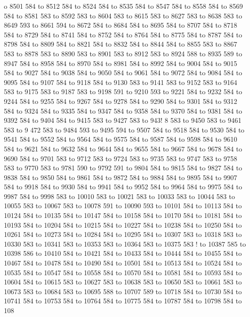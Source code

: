 o 8501 584 to 8512 584 to 8524 584 to 8535 584 to 8547 584 to 8558 584 to 8569 584 to 8581 583 to 8592 583 to 8604 583 to 8615 583 to 8627 583 to 8638 583 to 8649 593 to 8661 594 to 8672 584 to 8684 584 to 8695 584 to 8707 584 to 8718 584 to 8729 584 to 8741 584 to 8752 584 to 8764 584 to 8775 584 to 8787 584 to 8798 584 to 8809 584 to 8821 584 to 8832 584 to 8844 584 to 8855 583 to 8867 583 to 8878 583 to 8890 583 to 8901 583 to 8912 583 to 8924 588 to 8935 589 to 8947 584 to 8958 584 to 8970 584 to 8981 584 to 8992 584 to 9004 584 to 9015 584 to 9027 584 to 9038 584 to 9050 584 to 9061 584 to 9072 584 to 9084 584 to 9095 584 to 9107 584 to 9118 584 to 9130 583 to 9141 583 to 9152 583 to 9164 583 to 9175 583 to 9187 583 to 9198 591 to 9210 593 to 9221 584 to 9232 584 to 9244 584 to 9255 584 to 9267 584 to 9278 584 to 9290 584 to 9301 584 to 9312 584 to 9324 584 to 9335 584 to 9347 584 to 9358 584 to 9370 584 to 9381 584 to 9392 584 to 9404 584 to 9415 583 to 9427 583 to 943!
8 583 to 9450 583 to 9461 583 to 9
472 583 to 9484 593 to 9495 594 to 9507 584 to 9518 584 to 9530 584 to 9541 584 to 9552 584 to 9564 584 to 9575 584 to 9587 584 to 9598 584 to 9610 584 to 9621 584 to 9632 584 to 9644 584 to 9655 584 to 9667 584 to 9678 584 to 9690 584 to 9701 583 to 9712 583 to 9724 583 to 9735 583 to 9747 583 to 9758 583 to 9770 583 to 9781 590 to 9792 591 to 9804 584 to 9815 584 to 9827 584 to 9838 584 to 9850 584 to 9861 584 to 9872 584 to 9884 584 to 9895 584 to 9907 584 to 9918 584 to 9930 584 to 9941 584 to 9952 584 to 9964 584 to 9975 584 to 9987 584 to 9998 583 to 10010 583 to 10021 583 to 10033 583 to 10044 583 to 10055 583 to 10067 583 to 10078 591 to 10090 593 to 10101 584 to 10113 584 to 10124 584 to 10135 584 to 10147 584 to 10158 584 to 10170 584 to 10181 584 to 10193 584 to 10204 584 to 10215 584 to 10227 584 to 10238 584 to 10250 584 to 10261 584 to 10273 584 to 10284 584 to 10295 584 to 10307 583 to 10318 583 to 10330 583 to 10341 583 to 10353 583 to 10364 583 to 10375 583 !
to 10387 585 to 10398 586 to 10410
 584 to 10421 584 to 10433 584 to 10444 584 to 10455 584 to 10467 584 to 10478 584 to 10490 584 to 10501 584 to 10513 584 to 10524 584 to 10535 584 to 10547 584 to 10558 584 to 10570 584 to 10581 584 to 10593 584 to 10604 584 to 10615 583 to 10627 583 to 10638 583 to 10650 583 to 10661 583 to 10673 583 to 10684 583 to 10695 588 to 10707 589 to 10718 584 to 10730 584 to 10741 584 to 10753 584 to 10764 584 to 10775 584 to 10787 584 to 10798 584 to 108
